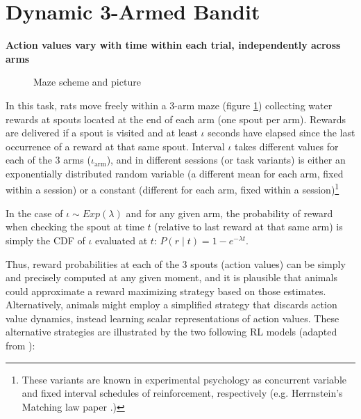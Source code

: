 \section{Dynamic 3-Armed Bandit}
\label{task:flux}

\textbf{Action values vary with time within each trial, independently across arms}

\begin{figure}[h]%
    \centering
    \qquad
    \caption{Maze scheme and picture}%
    \label{fig:3arm}%
\end{figure}

In this task, rats move freely within a 3-arm maze (figure \ref{fig:3arm}) collecting water rewards at spouts located at the end of each arm (one spout per arm).
Rewards are delivered if a spout is visited and at least $\iota$ seconds have elapsed since the last occurrence of a reward at that same spout.
Interval $\iota$ takes different values for each of the 3 arms ($\iota_{\text{arm}}$), and in different sessions (or task variants) is either an exponentially distributed random variable (a different mean for each arm, fixed within a session) or a constant (different for each arm, fixed within a session)\footnote{These variants are known in experimental psychology as concurrent variable and fixed interval schedules of reinforcement, respectively (e.g. Herrnstein's Matching law paper \cite{herrnstein1961relative}.)}

In the case of $\iota \sim Exp(\lambda)$ and for any given arm, the probability of reward when checking the spout at time $t$ (relative to last reward at that same arm) is simply the CDF of $\iota$ evaluated at $t$: $P(r \mid t) = 1 - e^{-\lambda t}$.

Thus, reward probabilities at each of the 3 spouts (action values) can be simply and precisely computed at any given moment, and it is plausible that animals could approximate a reward maximizing strategy based on those estimates.
Alternatively, animals might employ a simplified strategy that discards action value dynamics, instead learning scalar representations of action values.
These alternative strategies are illustrated by the two following RL models (adapted from \cite{constantino2015learning}):

